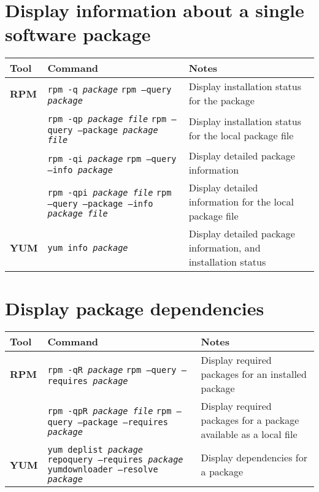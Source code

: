 \documentclass[10pt]{article}
\begin{document}
\section{Display information about a single software package}
\begin{tabular}{ p{3.5cm} p{9cm} p{11cm}}
  \hline
  \rowcolor{Gray}
  \textbf{Tool} & \textbf{Command} & \textbf{Notes} \\
  \hline 
  \textbf{RPM} & \texttt{rpm -q \textit{package}} \newline \texttt{rpm --query \textit{package}} & Display installation status for the package \\
  \rowcolor{Gray}
  & \texttt{rpm -qp \textit{package file}} \newline \texttt{rpm --query --package \textit{package file}}& Display installation status for the local package file\\
  & \texttt{rpm -qi \textit{package}} \newline \texttt{rpm --query --info \textit{package}} &  Display detailed package information \\
  \rowcolor{Gray}
  & \texttt{rpm -qpi \textit{package file}} \newline \texttt{rpm --query --package --info \textit{package file}} &  Display detailed information for the local package file\\
  \textbf{YUM} & \texttt{yum info \textit{package}} &  Display detailed package information, and installation status \\
  \hline
\end{tabular}

\section{Display package dependencies}
\begin{tabular}{ p{3.5cm} p{9cm} p{11cm}}
  \hline
  \rowcolor{Gray}
  \textbf{Tool} & \textbf{Command} & \textbf{Notes} \\
  \hline 
  \textbf{RPM} & \texttt{rpm -qR \textit{package}} \newline \texttt{rpm --query --requires \textit{package}} & Display required packages for an installed package \\
  \rowcolor{Gray}
  & \texttt{rpm -qpR \textit{package file}} \newline \texttt{rpm --query --package --requires \textit{package}} & Display required packages for a package available as a local file\\
  \textbf{YUM} & \texttt{yum deplist \textit{package}} \newline \texttt{repoquery --requires \textit{package}} \newline \texttt{yumdownloader --resolve \textit{package}} & Display dependencies for a package \\
  \hline
\end{tabular}
\end{document}
